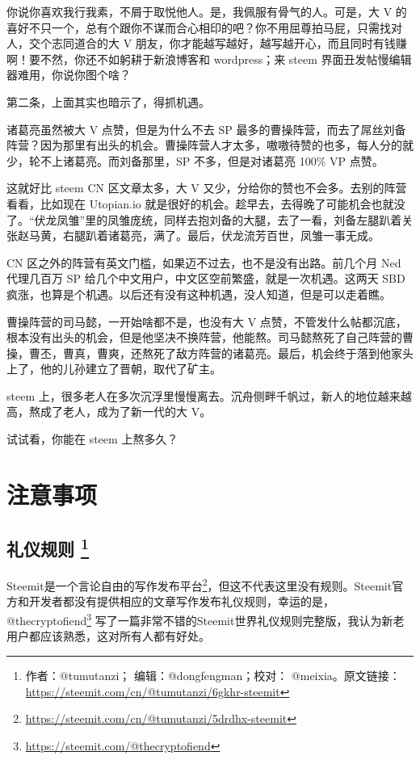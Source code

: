 \documentclass[]{ctexbook}
\renewcommand{\href}[2]{#2\footnote{\url{#1}}}
\begin{document}
你说你喜欢我行我素，不屑于取悦他人。是，我佩服有骨气的人。可是，大 V 的喜好不只一个，总有个跟你不谋而合心相印的吧？你不用屈尊拍马屁，只需找对人，交个志同道合的大 V 朋友，你才能越写越好，越写越开心，而且同时有钱赚啊！要不然，你还不如躬耕于新浪博客和 wordpress；来 steem 界面丑发帖慢编辑器难用，你说你图个啥？

第二条，上面其实也暗示了，得抓机遇。

诸葛亮虽然被大 V 点赞，但是为什么不去 SP 最多的曹操阵营，而去了屌丝刘备阵营？因为那里有出头的机会。曹操阵营人才太多，嗷嗷待赞的也多，每人分的就少，轮不上诸葛亮。而刘备那里，SP 不多，但是对诸葛亮 100\% VP 点赞。

这就好比 steem CN 区文章太多，大 V 又少，分给你的赞也不会多。去别的阵营看看，比如现在 Utopian.io 就是很好的机会。趁早去，去得晚了可能机会也就没了。``伏龙凤雏''里的凤雏庞统，同样去抱刘备的大腿，去了一看，刘备左腿趴着关张赵马黄，右腿趴着诸葛亮，满了。最后，伏龙流芳百世，凤雏一事无成。

CN 区之外的阵营有英文门槛，如果迈不过去，也不是没有出路。前几个月 Ned 代理几百万 SP 给几个中文用户，中文区空前繁盛，就是一次机遇。这两天 SBD 疯涨，也算是个机遇。以后还有没有这种机遇，没人知道，但是可以走着瞧。

曹操阵营的司马懿，一开始啥都不是，也没有大 V 点赞，不管发什么帖都沉底，根本没有出头的机会，但是他坚决不换阵营，他能熬。司马懿熬死了自己阵营的曹操，曹丕，曹真，曹爽，还熬死了敌方阵营的诸葛亮。最后，机会终于落到他家头上了，他的儿孙建立了晋朝，取代了矿主。

steem 上，很多老人在多次沉浮里慢慢离去。沉舟侧畔千帆过，新人的地位越来越高，熬成了老人，成为了新一代的大 V。

试试看，你能在 steem 上熬多久？

\hypertarget{zysxp}{%
\chapter{注意事项}\label{zysxp}}

\section[礼仪规则 ]{\texorpdfstring{礼仪规则 \footnote{作者：@tumutanzi； 编辑：@dongfengman；校对： @meixia。原文链接：\url{https://steemit.com/cn/@tumutanzi/6gkhr-steemit}}}{礼仪规则 }}

Steemit是一个\href{https://steemit.com/cn/@tumutanzi/5drdhx-steemit}{言论自由的写作发布平台}，但这不代表这里没有规则。Steemit官方和开发者都没有提供相应的文章写作发布礼仪规则，幸运的是， \href{https://steemit.com/@thecryptofiend}{@thecryptofiend} 写了一篇非常不错的Steemit世界礼仪规则完整版，我认为新老用户都应该熟悉，这对所有人都有好处。
\end{document}
